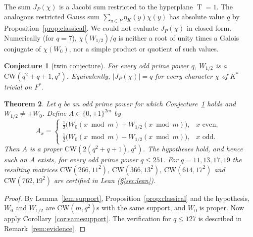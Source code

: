 \documentclass[11pt]{article}
\numberwithin{equation}{section}
\newtheorem{theorem}{Theorem}[section]
\newtheorem{conjecture}[theorem]{Conjecture}
\theoremstyle{definition}
\theoremstyle{remark}
\newcommand{\CW}{\mathrm{CW}}
\DeclareMathOperator{\Tr}{T}
\begin{document}
The sum $J_P(\chi)$ is a Jacobi sum restricted to the hyperplane $\Tr=1$. The analogous
restricted Gauss sum $\sum_{y\in P}\eta_K(y)\chi(y)$ has absolute value $q$ by
Proposition~\ref{prop:classical}. We could not evaluate $J_P(\chi)$ in closed form. Numerically
(for $q=7$), $\chi(W_{1/2})/q$ is neither a root of unity times a Galois conjugate of
$\chi(W_0)$, nor a simple product or quotient of such values.

\begin{conjecture}[twin conjecture]\label{conj:twin}
For every odd prime power $q$, $W_{1/2}$ is a $\CW(q^2+q+1,q^2)$. Equivalently,
$|J_P(\chi)|=q$ for every character $\chi$ of $K^*$ trivial on $F^*$.
\end{conjecture}

\begin{theorem}\label{thm:twin}
Let $q$ be an odd prime power for which Conjecture~\ref{conj:twin} holds and $W_{1/2}\ne\pm
W_0$. Define $A\in\{0,\pm1\}^{2m}$ by
\[
A_x=\begin{cases}\tfrac12\bigl(W_0(x\bmod m)+W_{1/2}(x\bmod m)\bigr), & x\text{ even},\\[2pt]
\tfrac12\bigl(W_0(x\bmod m)-W_{1/2}(x\bmod m)\bigr), & x\text{ odd}.\end{cases}
\]
Then $A$ is a proper $\CW(2(q^2+q+1),q^2)$. The hypotheses hold, and hence such an $A$ exists,
for every odd prime power $q\le251$. For $q=11,13,17,19$ the resulting matrices
$\CW(266,11^2)$, $\CW(366,13^2)$, $\CW(614,17^2)$ and $\CW(762,19^2)$ are certified in Lean
(\S\ref{sec:lean}).
\end{theorem}
\begin{proof}
By Lemma~\ref{lem:support}, Proposition~\ref{prop:classical} and the hypothesis, $W_0$ and
$W_{1/2}$ are $\CW(m,q^2)$s with the same support, and $W_0$ is proper. Now apply
Corollary~\ref{cor:samesupport}. The verification for $q\le127$ is described in
Remark~\ref{rem:evidence}.
\end{proof}
\end{document}
